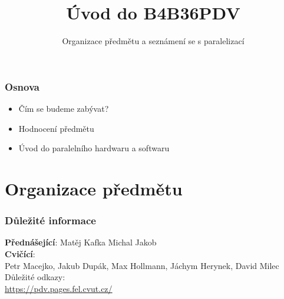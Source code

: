 \documentclass[usenames,dvipsnames,9pt]{beamer}
\title{Úvod do B4B36PDV}
\subtitle{Organizace předmětu a seznámení se s paralelizací}
\date{} %
\institute{B4B36PDV -- Paralelní a distribuované výpočty}
\begin{document}
\maketitle

\begin{frame}
  \frametitle{Osnova}
  \begin{itemize}
    \item Čím se budeme zabývat?
    \item Hodnocení předmětu\\[1.5em]
    \item Úvod do paralelního hardwaru a softwaru
  \end{itemize}
\end{frame}

\section{Organizace předmětu}

\begin{frame}
  \frametitle{Důležité informace}
  \small
  \textbf{Přednášející}: \hspace{5pt} Matěj Kafka \hspace{10pt} Michal Jakob \\[1em]
  \textbf{Cvičící}: \\
  \hspace*{10pt} Petr Macejko, Jakub Dupák, Max Hollmann, Jáchym Herynek, David Milec \\[3.5em]
  Důležité odkazy: \\[0.7em]
  {\Large\url{https://pdv.pages.fel.cvut.cz/}} \\[0.7em]
\end{frame}
\end{document}
